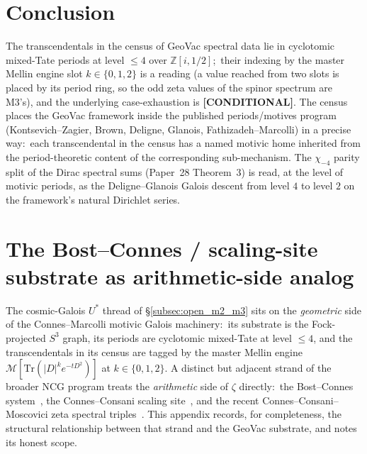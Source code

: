 \documentclass[11pt,a4paper]{article}
\theoremstyle{plain}
\theoremstyle{definition}
\newcommand{\sthree}{S^{3}}
\newcommand{\Z}{\mathbb{Z}}
\begin{document}
\section{Conclusion}
\label{sec:conclusion}

The transcendentals in the census of GeoVac spectral data lie in
cyclotomic mixed-Tate periods at level $\le 4$ over $\Z[i, 1/2]$;\ their
indexing by the master Mellin engine slot $k \in \{0, 1, 2\}$ is a reading
(a value reached from two slots is placed by its period ring, so the
odd zeta values of the spinor spectrum are M3's), and the underlying
case-exhaustion is \textbf{[CONDITIONAL]}.  The
census places the GeoVac framework inside the published
periods/motives program (Kontsevich--Zagier, Brown, Deligne, Glanois,
Fathizadeh--Marcolli) in a precise way:\ each transcendental in the
census has a named motivic home
inherited from the period-theoretic content of the corresponding
sub-mechanism.  The $\chi_{-4}$ parity split of the Dirac spectral
sums (Paper~28 Theorem~3) is read,
at the level of motivic periods, as the Deligne--Glanois Galois descent
from level $4$ to level $2$ on the framework's natural Dirichlet series.

\appendix
\section{The Bost--Connes / scaling-site substrate as arithmetic-side analog}
\label{app:bc_rh}

The cosmic-Galois $U^*$ thread of \S\ref{subsec:open_m2_m3} sits on the
\emph{geometric} side of the Connes--Marcolli motivic Galois
machinery:\ its substrate is the Fock-projected $\sthree$ graph, its
periods are cyclotomic mixed-Tate at level $\le 4$, and the
transcendentals in its census are tagged by the master Mellin engine
$\mathcal{M}[\mathrm{Tr}(|D|^k e^{-tD^2})]$ at $k \in \{0, 1, 2\}$.  A
distinct but adjacent strand of the broader NCG program treats the
\emph{arithmetic} side of $\zeta$ directly:\ the Bost--Connes
system~\cite{bost_connes1995}, the Connes--Consani scaling
site~\cite{connes_consani2014_scaling}, and the recent
Connes--Consani--Moscovici zeta spectral
triples~\cite{connes_consani_moscovici2025_zeta}.  This appendix
records, for completeness, the structural relationship between that
strand and the GeoVac substrate, and notes its honest scope.
\end{document}
